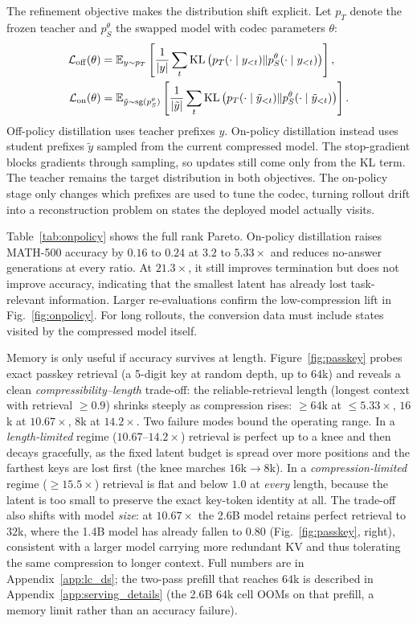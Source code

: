 \documentclass[10pt]{article}
\begin{document}
The refinement objective makes the distribution shift explicit. Let $p_T$ denote the frozen teacher and $p^\theta_S$ the swapped model with codec parameters $\theta$:
\begin{align}
\mathcal{L}_{\rm off}(\theta)
&=\mathbb{E}_{y\sim p_T}\left[\frac{1}{|y|}\sum_t
\mathrm{KL}\left(p_T(\cdot\mid y_{<t})\|p^\theta_S(\cdot\mid y_{<t})\right)\right], \\
\mathcal{L}_{\rm on}(\theta)
&=\mathbb{E}_{\tilde y\sim \mathrm{sg}(p^\theta_S)}\left[\frac{1}{|\tilde y|}\sum_t
\mathrm{KL}\left(p_T(\cdot\mid \tilde y_{<t})\|p^\theta_S(\cdot\mid \tilde y_{<t})\right)\right].
\label{eq:onpolicy_objective}
\end{align}
Off-policy distillation uses teacher prefixes $y$. On-policy distillation instead uses student prefixes $\tilde y$ sampled from the current compressed model. The stop-gradient blocks gradients through sampling, so updates still come only from the KL term. The teacher remains the target distribution in both objectives. The on-policy stage only changes which prefixes are used to tune the codec, turning rollout drift into a reconstruction problem on states the deployed model actually visits.

\TableOnPolicy
Table~\ref{tab:onpolicy} shows the full rank Pareto. On-policy distillation raises MATH-500 accuracy by $0.16$ to $0.24$ at $3.2$ to $5.33\times$ and reduces no-answer generations at every ratio. At $21.3\times$, it still improves termination but does not improve accuracy, indicating that the smallest latent has already lost task-relevant information. Larger re-evaluations confirm the low-compression lift in Fig.~\ref{fig:onpolicy}. For long rollouts, the conversion data must include states visited by the compressed model itself.

Memory is only useful if accuracy survives at length. Figure~\ref{fig:passkey} probes exact passkey retrieval (a 5-digit key at random depth, up to $64$k) and reveals a clean \emph{compressibility--length} trade-off: the reliable-retrieval length (longest context with retrieval $\ge 0.9$) shrinks steeply as compression rises: $\ge$$64$k at $\le 5.33\times$, $16$k at $10.67\times$, $8$k at $14.2\times$. Two failure modes bound the operating range. In a \emph{length-limited} regime ($10.67$--$14.2\times$) retrieval is perfect up to a knee and then decays gracefully, as the fixed latent budget is spread over more positions and the farthest keys are lost first (the knee marches $16$k$\to$$8$k). In a \emph{compression-limited} regime ($\ge 15.5\times$) retrieval is flat and below $1.0$ at \emph{every} length, because the latent is too small to preserve the exact key-token identity at all. The trade-off also shifts with model \emph{size}: at $10.67\times$ the 2.6B model retains perfect retrieval to $32$k, where the 1.4B model has already fallen to $0.80$ (Fig.~\ref{fig:passkey}, right), consistent with a larger model carrying more redundant KV and thus tolerating the same compression to longer context. Full numbers are in Appendix~\ref{app:lc_ds}; the two-pass prefill that reaches $64$k is described in Appendix~\ref{app:serving_details} (the 2.6B $64$k cell OOMs on that prefill, a memory limit rather than an accuracy failure).
\FigurePasskey
\end{document}
